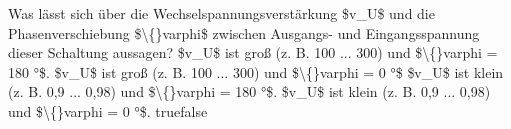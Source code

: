     {Was lässt sich über die Wechselspannungsverstärkung \$v\_U\$ und die Phasenverschiebung \$\textbackslash\{\}varphi\$ zwischen Ausgangs- und Eingangsspannung dieser Schaltung aussagen?}
    {\$v\_U\$ ist groß (z. B. 100 ... 300) und \$\textbackslash\{\}varphi = 180 °\$.}
    {\$v\_U\$ ist groß (z. B. 100 ... 300) und \$\textbackslash\{\}varphi = 0 °\$}
    {\$v\_U\$ ist klein (z. B. 0,9 ... 0,98) und \$\textbackslash\{\}varphi = 180 °\$.}
    {\$v\_U\$ ist klein (z. B. 0,9 ... 0,98) und \$\textbackslash\{\}varphi = 0 °\$.}
    {true}{false}